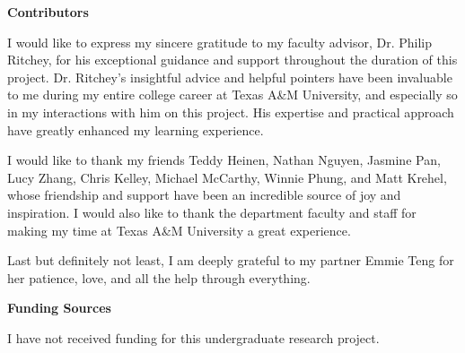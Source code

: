 
\noindent\textbf{Contributors} %

\indent\indent I would like to express my sincere gratitude to my faculty advisor, Dr. Philip Ritchey, for his exceptional guidance and support throughout the duration of this project. Dr. Ritchey's insightful advice and helpful pointers have been invaluable to me during my entire college career at Texas A\&M University, and especially so in my interactions with him on this project. His expertise and practical approach have greatly enhanced my learning experience.

\indent\indent I would like to thank my friends Teddy Heinen, Nathan Nguyen, Jasmine Pan, Lucy Zhang, Chris Kelley, Michael McCarthy, Winnie Phung, and Matt Krehel, whose friendship and support have been an incredible source of joy and inspiration. I would also like to thank the department faculty and staff for making my time at Texas A\&M University a great experience. 

\indent\indent Last but definitely not least, I am deeply grateful to my partner Emmie Teng for her patience, love, and all the help through everything.




\noindent\textbf{Funding Sources} %

\indent\indent I have not received funding for this undergraduate research project.


\pagebreak{}
